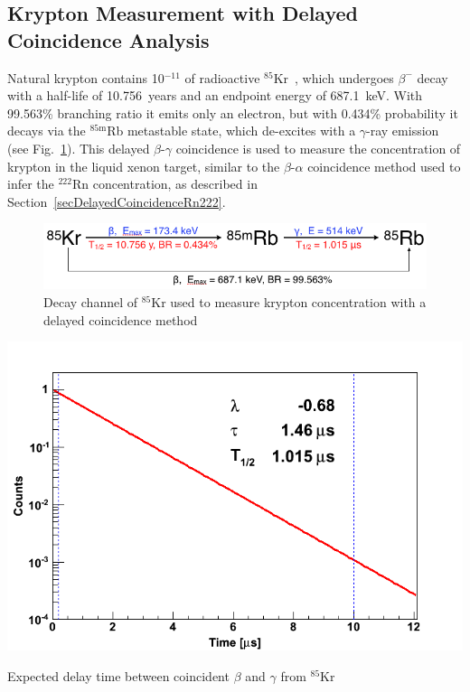 \subsection{Krypton Measurement with Delayed Coincidence Analysis}
\label{secDelayedCoincidenceKr85}

Natural krypton contains 10$^{-11}$ of radioactive $^{85}$Kr~\cite{Kr85abundance_1, Kr85abundance_2}, which undergoes $\beta^{-}$ decay with a half-life of 10.756~years and an endpoint energy of 687.1~keV. With 99.563\% branching ratio it emits only an electron, but with 0.434\% probability it decays via the $^{85\mathrm{m}}$Rb metastable state, which de-excites with a $\gamma$-ray emission (see Fig.~\ref{figKr85coincidence}). This delayed $\beta$-$\gamma$ coincidence is used to measure the concentration of krypton in the liquid xenon target, similar to the $\beta$-$\alpha$ coincidence method used to infer the $^{222}$Rn concentration, as described in Section~\ref{secDelayedCoincidenceRn222}. 


\begin{figure}[!h]
\centering
\includegraphics[width=0.55\linewidth]{plots/Kr85/Kr85coincidence1.png}
\caption{Decay channel of $^{85}$Kr used to measure krypton concentration with a delayed coincidence method}
\label{figKr85coincidence}
\end{figure}

\begin{floatingfigure}[l]{0.39\textwidth}
\centering
\includegraphics[width=0.39\linewidth]{plots/Kr85/DelayTime_Kr85.png}
\caption[Expected delay time between coincident $\beta$ and $\gamma$ from $^{85}$Kr decay]{Expected delay time between coincident $\beta$ and $\gamma$ from $^{85}$Kr}%
\label{figKrDelayTime}
\end{floatingfigure}

